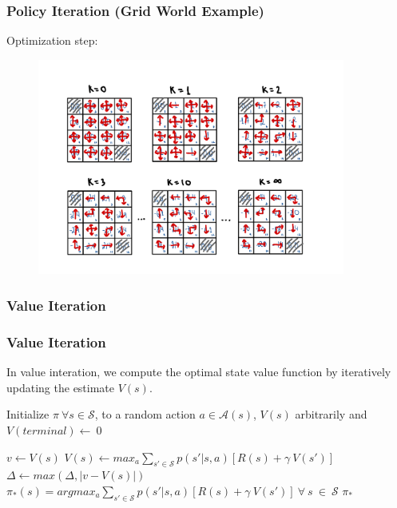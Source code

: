 \begin{frame}
    \frametitle{Policy Iteration (Grid World Example)}
    Optimization step:
    \begin{figure}
        \centering
        \includegraphics[width=0.9\textwidth]{sections/optimization/figures/grid_world_pi_5.pdf}
    \end{figure}
\end{frame}


\subsubsection{Value Iteration}

\begin{frame}
    \frametitle{Value Iteration}

    In value interation, we compute the optimal state value function 
    by iteratively updating the estimate $V(s)$.
        \begin{algorithmic}[1]
            \STATE Initialize $\pi~\forall s \in \mathcal{S}$, to a random action $a \in \mathcal{A}(s)$, 
            $V(s)$ arbitrarily and $V(terminal)\leftarrow~0$  
        
                    $v \leftarrow V(s)$
                    $V(s) \leftarrow max_{a}\sum_{s'\in\mathcal{S}}p(s'|s,a)[R(s)+\gamma~V(s')]$
                    $\Delta\leftarrow max(\Delta, |v-V(s)|)$
                \ENDFOR{}
            \ENDWHILE{}        
            \break
            $\pi_{*}(s) = argmax_{a}\sum_{s'\in\mathcal{S}}p(s'|s,a)[R(s)+\gamma~V(s')]~\forall~s~\in~\mathcal{S}$ 
            \RETURN $\pi_{*}$
        \end{algorithmic}

\end{frame} 

